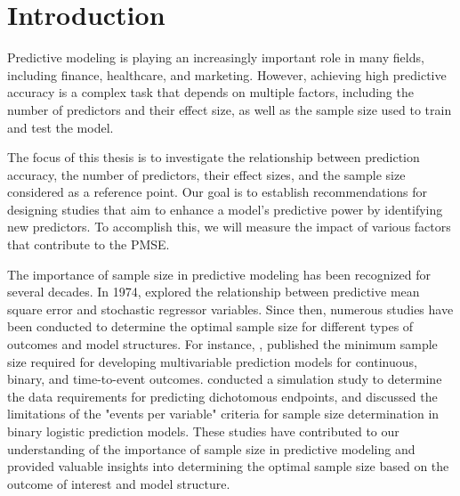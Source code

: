 \chapter{Introduction}

\noindent Predictive modeling is playing an increasingly important role in many fields, including finance, healthcare, and marketing. However, achieving high predictive accuracy is a complex task that depends on multiple factors, including the number of predictors and their effect size, as well as the sample size used to train and test the model. 

The focus of this thesis is to investigate the relationship between prediction accuracy, the number of predictors, their effect sizes, and the sample size considered as a reference point. Our goal is to establish recommendations for designing studies that aim to enhance a model's predictive power by identifying new predictors. To accomplish this, we will measure the impact of various factors that contribute to the PMSE.

The importance of sample size in predictive modeling has been recognized for several decades. In 1974, \cite{narula1974predictive}explored the relationship between predictive mean square error and stochastic regressor variables. Since then, numerous studies have been conducted to determine the optimal sample size for different types of outcomes and model structures. For instance, \cite{riley2019minimum}, \cite{riley2019minimums}published the minimum sample size required for developing multivariable prediction models for continuous, binary, and time-to-event outcomes. \cite{van2014modern} conducted a simulation study to determine the data requirements for predicting dichotomous endpoints, and \cite{van2019sample} discussed the limitations of the "events per variable" criteria for sample size determination in binary logistic prediction models. These studies have contributed to our understanding of the importance of sample size in predictive modeling and provided valuable insights into determining the optimal sample size based on the outcome of interest and model structure. 

